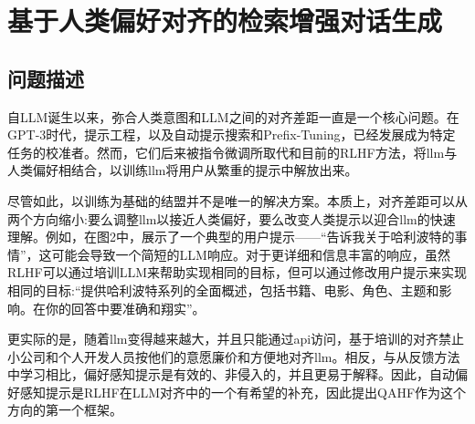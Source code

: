 \chapter{基于人类偏好对齐的检索增强对话生成}
\section{问题描述}

自LLM诞生以来，弥合人类意图和LLM之间的对齐差距一直是一个核心问题。在GPT-3\cite{DBLP:conf/nips/BrownMRSKDNSSAA20}时代，提示工程\cite{DBLP:conf/chi/ReynoldsM21}，以及自动提示搜索\cite{DBLP:conf/emnlp/ShinRLWS20}和Prefix-Tuning\cite{DBLP:journals/corr/abs-2103-10385,lester-etal-2021-power,DBLP:conf/acl/LiL20}，已经发展成为特定任务的校准者。然而，它们后来被指令微调\cite{DBLP:conf/iclr/WeiBZGYLDDL22}所取代和目前的RLHF方法\cite{DBLP:conf/nips/Ouyang0JAWMZASR22,DBLP:journals/corr/abs-2212-08073}，将llm与人类偏好相结合，以训练llm将用户从繁重的提示中解放出来。

尽管如此，以训练为基础的结盟并不是唯一的解决方案。本质上，对齐差距可以从两个方向缩小:要么调整llm以接近人类偏好，要么改变人类提示以迎合llm的快速理解。例如，在图2中，展示了一个典型的用户提示——“告诉我关于哈利波特的事情”，这可能会导致一个简短的LLM响应。对于更详细和信息丰富的响应，虽然RLHF可以通过培训LLM来帮助实现相同的目标，但可以通过修改用户提示来实现相同的目标:“提供哈利波特系列的全面概述，包括书籍、电影、角色、主题和影响。在你的回答中要准确和翔实”。

更实际的是，随着llm变得越来越大，并且只能通过api访问，基于培训的对齐禁止小公司和个人开发人员按他们的意愿廉价和方便地对齐llm。相反，与从反馈方法中学习相比，偏好感知提示是有效的、非侵入的，并且更易于解释。因此，自动偏好感知提示是RLHF在LLM对齐中的一个有希望的补充，因此提出QAHF作为这个方向的第一个框架。


